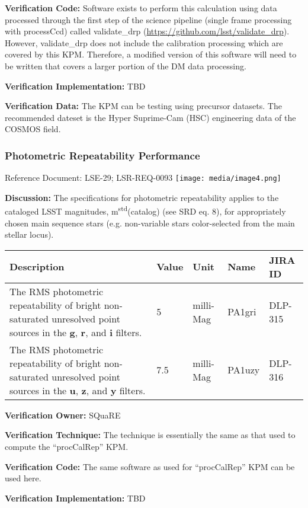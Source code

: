 \textbf{Verification Code:} Software exists to perform this calculation
using data processed through the first step of the science pipeline
(single frame processing with processCcd) called validate\_drp
(\url{https://github.com/lsst/validate_drp}). However, validate\_drp
does not include the calibration processing which are covered by this
KPM. Therefore, a modified version of this software will need to be
written that covers a larger portion of the DM data processing.

\textbf{Verification Implementation:} TBD

\textbf{Verification Data:} The KPM can be testing using precursor
datasets. The recommended dateset is the Hyper Suprime-Cam (HSC)
engineering data of the COSMOS field.

\subsubsection{Photometric Repeatability
Performance}\label{photometric-repeatability-performance}

Reference Document: LSE-29; LSR-REQ-0093
\texttt{[image: media/image4.png]}

\textbf{Discussion:} The specifications for photometric repeatability
applies to the cataloged LSST magnitudes,
m\textsuperscript{std}(catalog) (see SRD eq. 8), for appropriately
chosen main sequence stars (e.g. non-variable stars color-selected from
the main stellar locus).

\begin{longtable}[]{@{}lllll@{}}
\toprule
Description & Value & Unit & Name & JIRA ID\tabularnewline
\midrule
\endhead
The RMS photometric repeatability of bright non-saturated unresolved
point sources in the \textbf{g}, \textbf{r}, and \textbf{i} filters. & 5
& milli-Mag & PA1gri & DLP-315\tabularnewline
The RMS photometric repeatability of bright non-saturated unresolved
point sources in the \textbf{u}, \textbf{z}, and \textbf{y} filters. &
7.5 & milli-Mag & PA1uzy & DLP-316\tabularnewline
\bottomrule
\end{longtable}

\textbf{Verification Owner:} SQuaRE

\textbf{Verification Technique:} The technique is essentially the same
as that used to compute the ``procCalRep'' KPM.

\textbf{Verification Code:} The same software as used for ``procCalRep''
KPM can be used here.

\textbf{Verification Implementation:} TBD

